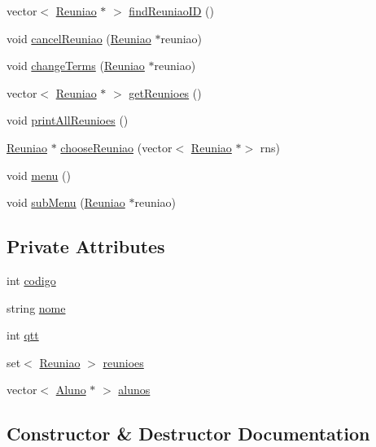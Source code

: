 \begin{DoxyCompactItemize}
\item 
vector$<$ \hyperlink{class_reuniao}{Reuniao} $\ast$ $>$ \hyperlink{class_docente_a75f4bb31ccff54cc38c34dbb333708df}{find\+Reuniao\+ID} ()
\item 
void \hyperlink{class_docente_af850bd3ba1bdf87cb179b24713eb463b}{cancel\+Reuniao} (\hyperlink{class_reuniao}{Reuniao} $\ast$reuniao)
\item 
void \hyperlink{class_docente_a852db58186f4e1a7e49dbaf35f8c567d}{change\+Terms} (\hyperlink{class_reuniao}{Reuniao} $\ast$reuniao)
\item 
vector$<$ \hyperlink{class_reuniao}{Reuniao} $\ast$ $>$ \hyperlink{class_docente_a8c7e74836d656bec642bb4ba3e3449c4}{get\+Reunioes} ()
\item 
void \hyperlink{class_docente_afb6708e3f626bb7dcdeba6e568b69e5c}{print\+All\+Reunioes} ()
\item 
\hyperlink{class_reuniao}{Reuniao} $\ast$ \hyperlink{class_docente_a5269740fc625141805801d499f377dad}{choose\+Reuniao} (vector$<$ \hyperlink{class_reuniao}{Reuniao} $\ast$$>$ rns)
\item 
void \hyperlink{class_docente_aa566202f3f83b288b630095ff5493a26}{menu} ()
\item 
void \hyperlink{class_docente_a00b8c20d2bf2f3015efb8710cc4dad89}{sub\+Menu} (\hyperlink{class_reuniao}{Reuniao} $\ast$reuniao)
\end{DoxyCompactItemize}
\subsection*{Private Attributes}
\begin{DoxyCompactItemize}
\item 
int \hyperlink{class_docente_aa1db9f8aaf6d2f21b2f418c989629171}{codigo}
\item 
string \hyperlink{class_docente_a66b320a22a0e829473b70f7fe11ac6d9}{nome}
\item 
int \hyperlink{class_docente_ab29ba6bb97580e8a8bb9dd5f53a532d6}{qtt}
\item 
set$<$ \hyperlink{class_reuniao}{Reuniao} $>$ \hyperlink{class_docente_a59b98f7d748eb407238f29208f5fb997}{reunioes}
\item 
vector$<$ \hyperlink{class_aluno}{Aluno} $\ast$ $>$ \hyperlink{class_docente_aa0d2dd3fca5eb6eeb6d1a2f75184e09e}{alunos}
\end{DoxyCompactItemize}


\subsection{Constructor \& Destructor Documentation}
\hypertarget{class_docente_a6a5a2767071333f26d8b9f78e594c62a}{}\label{class_docente_a6a5a2767071333f26d8b9f78e594c62a} 
